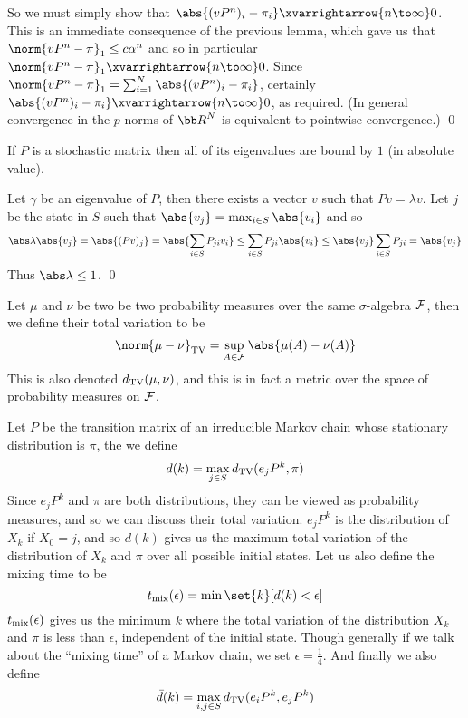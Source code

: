 \ethrm

So we must simply show that $\abs{(vP^n)_i-\pi_i}\xvarrightarrow{n\to\infty}0$.
This is an immediate consequence of the previous lemma, which gave us that $\norm{vP^n-\pi}_1\leq c\alpha^n$ and so in particular $\norm{vP^n-\pi}_1\xvarrightarrow{n\to\infty}0$.
Since $\norm{vP^n-\pi}_1=\sum_{i=1}^N\abs{(vP^n)_i-\pi_i}$, certainly $\abs{(vP^n)_i-\pi_i}\xvarrightarrow{n\to\infty}0$, as required.
(In general convergence in the $p$-norms of ${\bb R}^N$ is equivalent to pointwise convergence.)
\qed

\bcoro

    If $P$ is a stochastic matrix then all of its eigenvalues are bound by $1$ (in absolute value).

\ecoro

Let $\gamma$ be an eigenvalue of $P$, then there exists a vector $v$ such that $Pv=\lambda v$.
Let $j$ be the state in $S$ such that $\abs{v_j}=\max_{i\in S}\abs{v_i}$ and so
$$ \abs\lambda\abs{v_j} = \abs{(Pv)_j} = \abs{\sum_{i\in S}P_{ji}v_i} \leq \sum_{i\in S}P_{ji}\abs{v_i} \leq \abs{v_j}\sum_{i\in S}P_{ji} = \abs{v_j} $$
Thus $\abs\lambda\leq1$.
\qed

\bdefn

    Let $\mu$ and $\nu$ be two be two probability measures over the same $\sigma$-algebra ${\cal F}$, then we define their {\emphcolor total variation} to be
    $$ \norm{\mu-\nu}_{\rm TV} = \sup_{A\in{\cal F}}\abs{\mu(A)-\nu(A)} $$
    This is also denoted $d_{\rm TV}(\mu,\nu)$, and this is in fact a metric over the space of probability measures on ${\cal F}$.

\edefn

\bdefn

    Let $P$ be the transition matrix of an irreducible Markov chain whose stationary distribution is $\pi$, the we define
    $$ d(k) = \max_{j\in S}d_{\rm TV}(e_jP^k,\pi) $$
    Since $e_jP^k$ and $\pi$ are both distributions, they can be viewed as probability measures, and so we can discuss their total variation.
    $e_jP^k$ is the distribution of $X_k$ if $X_0=j$, and so $d(k)$ gives us the maximum total variation of the distribution of $X_k$ and $\pi$ over all possible initial states.
    Let us also define the {\emphcolor mixing time} to be
    $$ t_{\rm mix}(\epsilon) = \min\set{k}[d(k)<\epsilon] $$
    $t_{\rm mix}(\epsilon)$ gives us the minimum $k$ where the total variation of the distribution $X_k$ and $\pi$ is less than $\epsilon$, independent of the initial state.
    Though generally if we talk about the ``mixing time'' of a Markov chain, we set $\epsilon=\frac14$.
    And finally we also define
    $$ \bar d(k) = \max_{i,j\in S}d_{\rm TV}(e_iP^k,e_jP^k) $$

